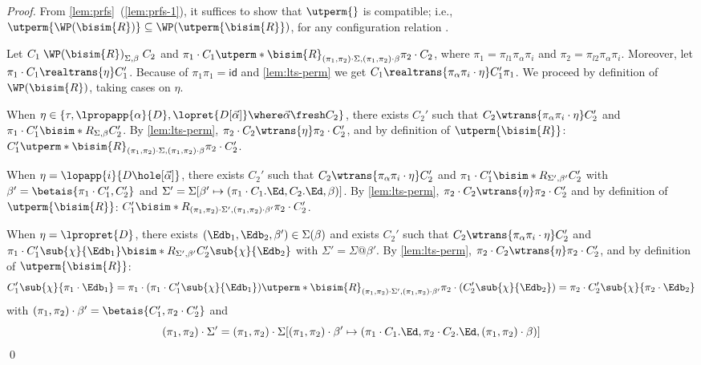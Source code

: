 \begin{proof}
  From \cref{lem:prfs}~(\ref{lem:prfs-1}), it suffices to show that $\utperm{}$ is compatible; i.e.,
  ${\utperm{\WP(\bisim{R})}} \subseteq \WP(\utperm{\bisim{R}})$, for any configuration relation .

  Let $C_1 \mathrel{\WP(\bisim{R})}_{\Sigma,\beta} C_2$ and 
  $\pi_1\cdot C_1 \utperm*{\bisim{R}}_{(\pi_1,\pi_2)\cdot\Sigma,(\pi_1,\pi_2)\cdot\beta} \pi_2\cdot C_2$,
  where $\pi_1=\pi_{l1}\pi_\alpha\pi_i$ and $\pi_2=\pi_{l2}\pi_\alpha\pi_i$.
  Moreover, let $\pi_1\cdot C_1 \realtrans{\eta} C_1'$.
  Because of $\pi_1 \pi_1 = \mathsf{id}$ and \cref{lem:lts-perm} we get
  $C_1 \realtrans{\pi_\alpha\pi_i\cdot\eta} C_1'\pi_1$.
  We proceed by definition of $\WP(\bisim{R})$, taking cases on $\eta$.

  When $\eta\in\{\tau,\lpropapp{\alpha}{D},\lopret{D[\vec\alpha]} \where \vec\alpha\fresh C_2\}$,  there exists $C_2'$ such that
  $C_2 \wtrans{\pi_\alpha\pi_i\cdot\eta} C_2'$ and $\pi_1\cdot C_1' \bisim*{R}_{\Sigma,\beta} C_2'$. By \cref{lem:lts-perm},
  $\pi_2\cdot C_2 \wtrans{\eta} \pi_2\cdot C_2'$, and by definition of $\utperm{\bisim{R}}$:
  $C_1' \utperm*{\bisim{R}}_{(\pi_1,\pi_2)\cdot\Sigma,(\pi_1,\pi_2)\cdot\beta} \pi_2\cdot C_2'$.

  When $\eta=\lopapp{i}{D\hole[\vec \alpha]}$, there exists $C_2'$ such that
  $C_2 \wtrans{\pi_\alpha\pi_i\cdot\eta}  C_2'$
  and
  $\pi_1\cdot C_1' \bisim*{R}_{\Sigma',\beta'} C_2'$
  with $\beta' = \betais{\pi_1\cdot C_1',C_2'}$ and $\Sigma' = \Sigma[\beta' \mapsto (\pi_1\cdot C_1.\Ed, C_2.\Ed, \beta)]$.
  By \cref{lem:lts-perm},
  $\pi_2\cdot C_2 \wtrans{\eta}  \pi_2\cdot C_2'$
  and by definition of $\utperm{\bisim{R}}$:
  $C_1' \bisim*{R}_{(\pi_1,\pi_2)\cdot\Sigma',(\pi_1,\pi_2)\cdot\beta'} \pi_2\cdot C_2'$.

  When $\eta=\lpropret{D}$, there exists 
  $(\Edb_1,\Edb_2,\beta') \in \Sigma(\beta)$
  and exists
  $C_2'$ such that
  $C_2 \wtrans{\pi_\alpha\pi_i\cdot\eta} C_2'$ and
  $\pi_1\cdot C_1'\sub{\chi}{\Edb_1} \bisim*{R}_{\Sigma',\beta'} C_2'\sub{\chi}{\Edb_2}$
  with $\Sigma' = \Sigma@\beta'$.
  By \cref{lem:lts-perm},
  $\pi_2\cdot C_2 \wtrans{\eta} \pi_2\cdot C_2'$, and by definition of $\utperm{\bisim{R}}$:
  $$C_1'\sub{\chi}{\pi_1\cdot\Edb_1}=\pi_1\cdot (\pi_1\cdot C_1'\sub{\chi}{\Edb_1})
    \utperm*{\bisim{R}}_{(\pi_1,\pi_2)\cdot\Sigma',(\pi_1,\pi_2)\cdot\beta'}
    \pi_2\cdot(C_2'\sub{\chi}{\Edb_2})=\pi_2\cdot C_2'\sub{\chi}{\pi_2\cdot\Edb_2}$$
  with $(\pi_1,\pi_2)\cdot\beta' = \betais{C_1',\pi_2\cdot C_2'}$ and
  $$(\pi_1,\pi_2)\cdot\Sigma' = (\pi_1,\pi_2)\cdot\Sigma[(\pi_1,\pi_2)\cdot\beta' \mapsto (\pi_1\cdot C_1.\Ed, \pi_2\cdot C_2.\Ed, (\pi_1,\pi_2)\cdot\beta)]$$
\qed
\end{proof}

